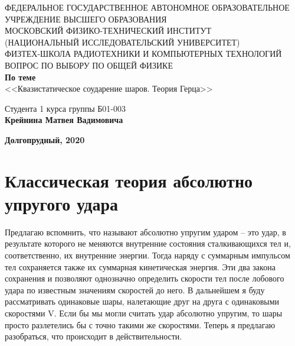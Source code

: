 \documentclass[a4paper]{article}
\begin{document}
\begin{center}
	\hfill \break
	\hfill \break
	{\small ФЕДЕРАЛЬНОЕ ГОСУДАРСТВЕННОЕ АВТОНОМНОЕ ОБРАЗОВАТЕЛЬНОЕ\\ УЧРЕЖДЕНИЕ ВЫСШЕГО ОБРАЗОВАНИЯ\\ МОСКОВСКИЙ ФИЗИКО-ТЕХНИЧЕСКИЙ ИНСТИТУТ\\ (НАЦИОНАЛЬНЫЙ ИССЛЕДОВАТЕЛЬСКИЙ УНИВЕРСИТЕТ)\\ ФИЗТЕХ-ШКОЛА РАДИОТЕХНИКИ И КОМПЬЮТЕРНЫХ ТЕХНОЛОГИЙ}\\

	\hfill \break
	\normalsize{ВОПРОС ПО ВЫБОРУ ПО ОБЩЕЙ ФИЗИКЕ}\\
	\vspace{7em}
	\normalsize{\textbf{По теме}}\\
	\vspace{7em}
	\large{<<Квазистатическое соударение шаров. Теория Герца>>}\\
\end{center}

\vspace{16em}
\begin{flushright}
	\normalsize{Студента 1 курса группы Б01-003}\\
	\normalsize{\textbf{Крейнина Матвея Вадимовича}}\\
\end{flushright}

\vspace{\fill}
\begin{center}
	\normalsize{\textbf{Долгопрудный, 2020}}
\end{center}


\thispagestyle{empty} %


\newpage
\tableofcontents
\newpage

\section{Классическая теория абсолютно упругого удара}


Предлагаю вспомнить, что называют абсолютно упругим ударом -- это удар, в результате которого не меняются внутренние состояния сталкивающихся тел и, соответственно, их внутренние энергии. Тогда наряду с суммарным импульсом тел сохраняется также их суммарная кинетическая энергия. Эти два закона сохранения и позволяют однозначно определить скорости тел после лобового удара по известным значениям скоростей до него. В дальнейшем я буду рассматривать одинаковые шары, налетающие друг на друга с одинаковыми скоростями V. Если бы мы могли считать удар абсолютно упругим, то шары просто разлетелись бы с точно такими же скоростями. Теперь я предлагаю разобраться, что происходит в действительности.
\end{document}

